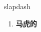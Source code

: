 
\begin{frame}
{\huge slapdash}
\begin{center}
\begin{enumerate}\Large
  \item \textbf{马虎的}
\end{enumerate}
\end{center}
\end{frame}
